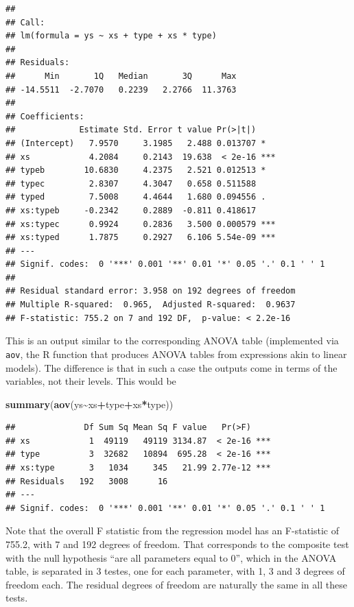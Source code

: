 \documentclass[
]{book}
\newenvironment{Shaded}{\begin{snugshade}}{\end{snugshade}}
\newcommand{\FunctionTok}[1]{\textcolor[rgb]{0.13,0.29,0.53}{\textbf{#1}}}
\newcommand{\NormalTok}[1]{#1}
\newcommand{\SpecialCharTok}[1]{\textcolor[rgb]{0.81,0.36,0.00}{\textbf{#1}}}
\begin{document}
\begin{verbatim}
## 
## Call:
## lm(formula = ys ~ xs + type + xs * type)
## 
## Residuals:
##      Min       1Q   Median       3Q      Max 
## -14.5511  -2.7070   0.2239   2.2766  11.3763 
## 
## Coefficients:
##             Estimate Std. Error t value Pr(>|t|)    
## (Intercept)   7.9570     3.1985   2.488 0.013707 *  
## xs            4.2084     0.2143  19.638  < 2e-16 ***
## typeb        10.6830     4.2375   2.521 0.012513 *  
## typec         2.8307     4.3047   0.658 0.511588    
## typed         7.5008     4.4644   1.680 0.094556 .  
## xs:typeb     -0.2342     0.2889  -0.811 0.418617    
## xs:typec      0.9924     0.2836   3.500 0.000579 ***
## xs:typed      1.7875     0.2927   6.106 5.54e-09 ***
## ---
## Signif. codes:  0 '***' 0.001 '**' 0.01 '*' 0.05 '.' 0.1 ' ' 1
## 
## Residual standard error: 3.958 on 192 degrees of freedom
## Multiple R-squared:  0.965,  Adjusted R-squared:  0.9637 
## F-statistic: 755.2 on 7 and 192 DF,  p-value: < 2.2e-16
\end{verbatim}

This is an output similar to the corresponding ANOVA table (implemented via \texttt{aov}, the R function that produces ANOVA tables from expressions akin to linear models). The difference is that in such a case the outputs come in terms of the variables, not their levels. This would be

\begin{Shaded}
\begin{Highlighting}[]
\FunctionTok{summary}\NormalTok{(}\FunctionTok{aov}\NormalTok{(ys}\SpecialCharTok{\textasciitilde{}}\NormalTok{xs}\SpecialCharTok{+}\NormalTok{type}\SpecialCharTok{+}\NormalTok{xs}\SpecialCharTok{*}\NormalTok{type))}
\end{Highlighting}
\end{Shaded}

\begin{verbatim}
##              Df Sum Sq Mean Sq F value   Pr(>F)    
## xs            1  49119   49119 3134.87  < 2e-16 ***
## type          3  32682   10894  695.28  < 2e-16 ***
## xs:type       3   1034     345   21.99 2.77e-12 ***
## Residuals   192   3008      16                     
## ---
## Signif. codes:  0 '***' 0.001 '**' 0.01 '*' 0.05 '.' 0.1 ' ' 1
\end{verbatim}

Note that the overall F statistic from the regression model has an F-statistic of
755.2, with
7 and
192 degrees of freedom. That corresponds to the composite test with the null hypothesis ``are all parameters equal to 0'', which in the ANOVA table, is separated in 3 testes, one for each parameter, with 1, 3 and 3 degrees of freedom each. The residual degrees of freedom are naturally the same in all these tests.
\end{document}
